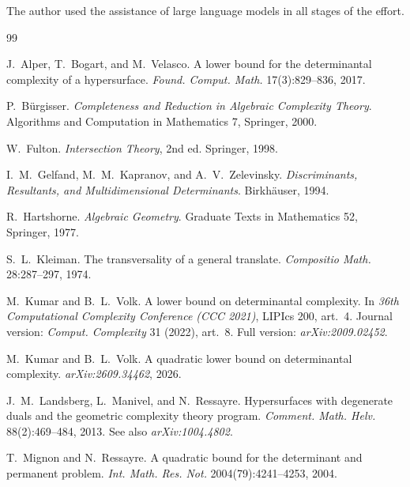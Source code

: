 \documentclass[acmsmall,screen,nonacm]{acmart}
\theoremstyle{definition}
\theoremstyle{remark}
\begin{document}
\begin{acks}
The author used the assistance of large language models in all stages of the effort. 
\end{acks}



\begin{thebibliography}{99}

J.~Alper, T.~Bogart, and M.~Velasco.
\newblock A lower bound for the determinantal complexity of a
hypersurface.
\newblock \emph{Found. Comput. Math.} 17(3):829--836, 2017.

P.~B\"urgisser.
\newblock \emph{Completeness and Reduction in Algebraic Complexity
Theory}.
\newblock Algorithms and Computation in Mathematics 7, Springer, 2000.

W.~Fulton.
\newblock \emph{Intersection Theory}, 2nd ed.
\newblock Springer, 1998.

I.~M.~Gelfand, M.~M.~Kapranov, and A.~V.~Zelevinsky.
\newblock \emph{Discriminants, Resultants, and Multidimensional
Determinants}.
\newblock Birkh\"auser, 1994.

R.~Hartshorne.
\newblock \emph{Algebraic Geometry}.
\newblock Graduate Texts in Mathematics 52, Springer, 1977.

S.~L.~Kleiman.
\newblock The transversality of a general translate.
\newblock \emph{Compositio Math.} 28:287--297, 1974.

M.~Kumar and B.~L.~Volk.
\newblock A lower bound on determinantal complexity.
\newblock In \emph{36th Computational Complexity Conference (CCC
2021)}, LIPIcs 200, art.~4.  Journal version: \emph{Comput.
Complexity} 31 (2022), art.~8.  Full version: \emph{arXiv:2009.02452}.

M.~Kumar and B.~L.~Volk.
\newblock A quadratic lower bound on determinantal complexity.
\newblock \emph{arXiv:2609.34462}, 2026.

J.~M.~Landsberg, L.~Manivel, and N.~Ressayre.
\newblock Hypersurfaces with degenerate duals and the geometric
complexity theory program.
\newblock \emph{Comment. Math. Helv.} 88(2):469--484, 2013.
\newblock See also \emph{arXiv:1004.4802}.

T.~Mignon and N.~Ressayre.
\newblock A quadratic bound for the determinant and permanent problem.
\newblock \emph{Int. Math. Res. Not.} 2004(79):4241--4253, 2004.


\end{thebibliography}
\end{document}
